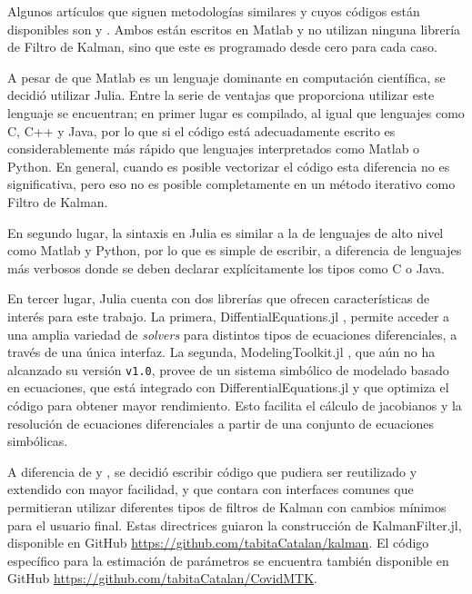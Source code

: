 Algunos artículos que siguen metodologías similares y cuyos códigos están disponibles son \cite{Hasan2020} y \cite{Sameni2020}. Ambos están escritos en Matlab y no utilizan ninguna librería de Filtro de Kalman, sino que este es programado desde cero para cada caso.

A pesar de que Matlab es un lenguaje dominante en computación científica, se decidió utilizar Julia. Entre la serie de ventajas que proporciona utilizar este lenguaje se encuentran; en primer lugar es compilado, al igual que lenguajes como C, C++ y Java, por lo que si el código está adecuadamente escrito es considerablemente más rápido que lenguajes interpretados como Matlab o Python. En general, cuando es posible vectorizar el código esta diferencia no es significativa, pero eso no es posible completamente en un método iterativo como Filtro de Kalman.

En segundo lugar, la sintaxis en Julia es similar a la de lenguajes de alto nivel como Matlab y Python, por lo que es simple de escribir, a diferencia de lenguajes más verbosos donde se deben declarar explícitamente los tipos como C o Java.

En tercer lugar, Julia cuenta con dos librerías que ofrecen características de interés para este trabajo. La primera, DiffentialEquations.jl \cite{Rackauckas2017}, permite acceder a una amplia variedad de \textit{solvers} para distintos tipos de ecuaciones diferenciales, a través de una única interfaz. La segunda, ModelingToolkit.jl \cite{Ma2021}, que aún no ha alcanzado su versión \texttt{v1.0}, provee de un sistema simbólico de modelado basado en ecuaciones, que está integrado con DifferentialEquations.jl y que optimiza el código para obtener mayor rendimiento. Esto facilita el cálculo de jacobianos y la resolución de ecuaciones diferenciales a partir de una conjunto de ecuaciones simbólicas.

A diferencia de \cite{Hasan2020} y \cite{Sameni2020}, se decidió escribir código que pudiera ser reutilizado y extendido con mayor facilidad, y que contara con interfaces comunes que permitieran utilizar diferentes tipos de filtros de Kalman con cambios mínimos para el usuario final. Estas directrices guiaron la construcción de KalmanFilter.jl, disponible en GitHub \url{https://github.com/tabitaCatalan/kalman}. El código específico para la estimación de parámetros se encuentra también disponible en GitHub \url{https://github.com/tabitaCatalan/CovidMTK}.

